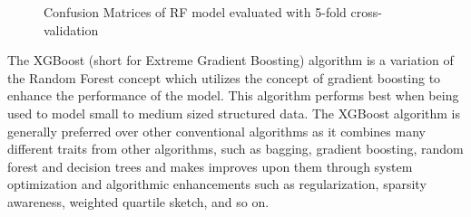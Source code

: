 \documentclass[runningheads]{llncs}
\makeatletter
\let\oldsubsubsection\subsubsection
\renewcommand\subsubsection{\@ifstar{\oldsubsubsection}{\oldsubsubsection*}}
\makeatother
\begin{document}
\begin{figure}
\centering


\caption{Confusion Matrices of RF model evaluated with 5-fold
cross-validation}

\label{fig:rf_cf}

\end{figure}

\hypertarget{xgboost}{%
\subsubsection{XGBoost}\label{xgboost}}

The XGBoost (short for Extreme Gradient Boosting) algorithm is a
variation of the Random Forest concept which utilizes the concept of
gradient boosting to enhance the performance of the model. This
algorithm performs best when being used to model small to medium sized
structured data. The XGBoost algorithm is generally preferred over other
conventional algorithms as it combines many different traits from other
algorithms, such as bagging, gradient boosting, random forest and
decision trees and makes improves upon them through system optimization
and algorithmic enhancements such as regularization, sparsity awareness,
weighted quartile sketch, and so on.
\end{document}
